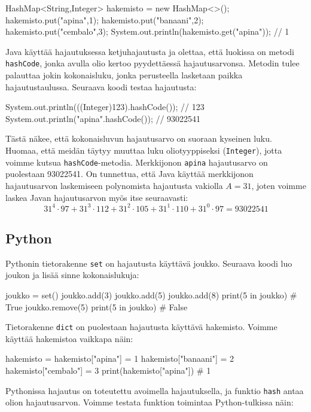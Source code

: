 \begin{code}
HashMap<String,Integer> hakemisto = new HashMap<>();
hakemisto.put("apina",1);
hakemisto.put("banaani",2);
hakemisto.put("cembalo",3);
System.out.println(hakemisto.get("apina")); // 1
\end{code}

Java käyttää hajautuksessa ketjuhajautusta ja olettaa,
että luokissa on metodi \texttt{hashCode},
jonka avulla olio kertoo pyydettäessä hajautusarvonsa.
Metodin tulee palauttaa jokin kokonaisluku, jonka perusteella
lasketaan paikka hajautustaulussa. Seuraava koodi testaa hajautusta:

\begin{code}
System.out.println(((Integer)123).hashCode()); // 123
System.out.println("apina".hashCode()); // 93022541
\end{code}

Tästä näkee, että kokonaisluvun hajautusarvo on suoraan
kyseinen luku.
Huomaa, että meidän täytyy muuttaa luku oliotyyppiseksi
(\texttt{Integer}), jotta voimme kutsua \texttt{hashCode}-metodia.
Merkkijonon \texttt{apina} hajautusarvo on puolestaan 93022541.
On tunnettua, että Java käyttää merkkijonon hajautusarvon laskemiseen
polynomista hajautusta vakiolla $A=31$,
joten voimme laskea Javan hajautusarvon myös itse seuraavasti:
\[31^4 \cdot 97+31^3 \cdot 112+31^2 \cdot 105+31^1 \cdot 110+31^0 \cdot 97=93022541\]

\subsection{Python}

Pythonin tietorakenne \texttt{set} on hajautusta käyttävä joukko.
Seuraava koodi luo joukon ja lisää sinne kokonaislukuja:

\begin{code}
joukko = set()
joukko.add(3)
joukko.add(5)
joukko.add(8)
print(5 in joukko) # True
joukko.remove(5)
print(5 in joukko) # False
\end{code}

Tietorakenne \texttt{dict} on puolestaan hajautusta käyttävä hakemisto.
Voimme käyttää hakemistoa vaikkapa näin:

\begin{code}
hakemisto = {}
hakemisto["apina"] = 1
hakemisto["banaani"] = 2
hakemisto["cembalo"] = 3
print(hakemisto["apina"]) # 1
\end{code}

Pythonissa hajautus on toteutettu avoimella hajautuksella,
ja funktio \texttt{hash} antaa olion hajautusarvon.
Voimme testata funktion toimintaa Python-tulkissa näin:

